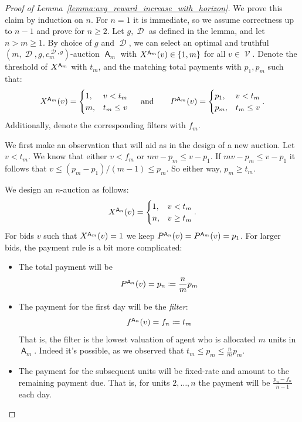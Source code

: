 \documentclass[11pt,letterpaper]{article}
\newcommand{\set}[1]{\left\{#1\right\}}
\newcommand{\brackets}[1]{\left( #1 \right)}
\newcommand{\fr}{fixed-rate\xspace}
\DeclareMathOperator{\A}{\auc{A}}
\DeclareMathOperator{\D}{\mathcal{D}}
\DeclareMathOperator{\V}{\mathcal{V}}
\newcommand{\g}{g}
\theoremstyle{plain}
\newcommand{\auc}[1]{\mathsf{#1}}
\begin{document}
\begin{proof}[Proof of Lemma~\ref{lemma:avg_reward_increase_with_horizon}]
    We prove this claim by induction on $n$. For $n=1$ it is immediate, so we assume correctness up to $n-1$ and prove for $n\geq 2$.
    Let $\g,\D$ as defined in the lemma, and let $n>m\geq 1$. By choice of $\g$ and $\D$, we can select an optimal and truthful $\brackets{m,\D,\g,c_m^{\D,\g}}$-auction $\A_m$ with $\x[\A_m]{v}\in\set{1,m}$ for all $v\in\V$. Denote the threshold of $\alloc[\A_m]$ with $t_m$, and the matching total payments with $p_1,p_m$ such that:
    \begin{align*}
     \x[\A_m]{v}=\begin{cases}
        1,&v<t_m\\
        m,&t_m\leq v
    \end{cases}\ \ \ \ \textnormal{and}\ \ \ \ \ \    \p[\A_m]{v}=\begin{cases}
        p_1,&v<t_m\\
        p_m,&t_m\leq v
    \end{cases}.
    \end{align*}
    Additionally, denote the corresponding filters with $f_m$.

    We first make an observation that will aid as in the design of a new auction. Let $v<t_m$. We know that either $v<f_m$ or $mv-p_m\leq v-p_1$. If $mv-p_m\leq v-p_1$ it follows that $v\leq(p_m-p_1)/(m-1)\leq p_m$. So either way, $p_m\geq t_m$.

    We design an $n$-auction as follows:
    \begin{align*}
        \x[\A_n]{v}=\begin{cases}
            1,& v<t_m\\
            n,& v\geq t_m
        \end{cases}.
    \end{align*}
    For bids $v$ such that $\x[\A_m]{v}= 1$ we keep $\p[\A_n]{v}=\p[\A_m]{v}=p_1$. For larger bids, the payment rule is a bit more complicated:
    \begin{itemize}
        \item The total payment will be
        \begin{equation}
            \p[\A_n]{v}=p_n\coloneq\frac{n}{m}p_m
        \end{equation}
        \item The payment for the first day will be the \emph{filter}:
        \begin{equation}
            \f[\A_n]{v}=f_n\coloneq t_m
        \end{equation}
        That is, the filter is the lowest valuation of agent who is allocated $m$ units in $\A_m$. Indeed it's possible, as we observed that $t_m\leq p_m\leq \frac{n}{m}p_m$. 
        \item The payment for the subsequent units will be \fr and amount to the remaining payment due. That is, for units $2,\dots,n$ the payment will be $\frac{p_n-f_n}{n-1}$ each day.
    \end{itemize}


\end{proof}
\end{document}
